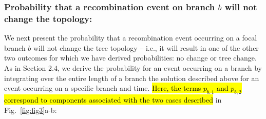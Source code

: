\documentclass[11pt]{article}
\begin{document}
\subsubsection{Probability that a recombination event on branch $b$ will not change the topology:}
We next present the probability that a recombination event occurring on a focal 
branch $b$ will not change the tree topology -- i.e., it will result in one of the 
other two outcomes for which we have derived probabilities: no change or tree change.
As in Section 2.4, we derive the probability for an event occurring on a branch by 
integrating over the entire length of a branch the solution described above for an 
event occurring on a specific branch and time. 
 \hl{Here, the terms $p_{b,1}$ and $p_{b,2}$ correspond to components
associated with the two cases described} in Fig.~\ref{fig:fig3}a-b:

\end{document}
